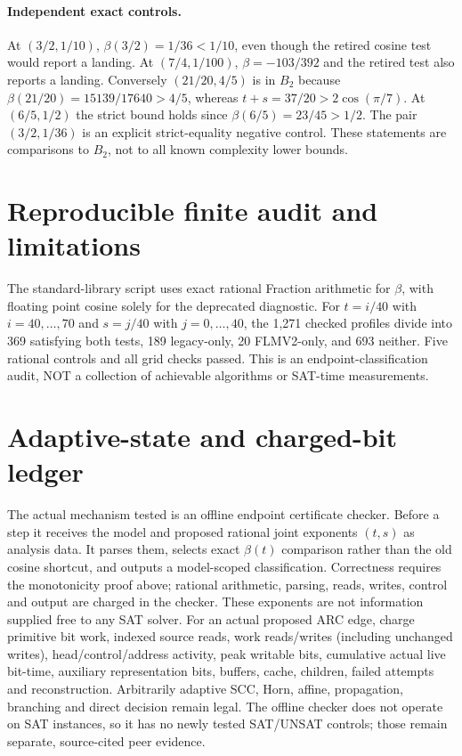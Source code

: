 \documentclass[11pt]{article}
\begin{document}
\paragraph{Independent exact controls.}
At $(3/2,1/10)$, $\beta(3/2)=1/36<1/10$, even though the retired cosine test would report a landing. At $(7/4,1/100)$, $\beta=-103/392$ and the retired test also reports a landing. Conversely $(21/20,4/5)$ is in $B_2$ because $\beta(21/20)=15139/17640>4/5$, whereas $t+s=37/20>2\cos(\pi/7)$. At $(6/5,1/2)$ the strict bound holds since $\beta(6/5)=23/45>1/2$. The pair $(3/2,1/36)$ is an explicit strict-equality negative control. These statements are comparisons to $B_2$, not to all known complexity lower bounds.

\section{Reproducible finite audit and limitations}
The standard-library script uses exact rational Fraction arithmetic for $\beta$, with floating point cosine solely for the deprecated diagnostic. For $t=i/40$ with $i=40,\ldots,70$ and $s=j/40$ with $j=0,\ldots,40$, the 1,271 checked profiles divide into 369 satisfying both tests, 189 legacy-only, 20 FLMV2-only, and 693 neither. Five rational controls and all grid checks passed. This is an endpoint-classification audit, NOT a collection of achievable algorithms or SAT-time measurements.

\section{Adaptive-state and charged-bit ledger}
The actual mechanism tested is an offline endpoint certificate checker. Before a step it receives the model and proposed rational joint exponents $(t,s)$ as analysis data. It parses them, selects exact $\beta(t)$ comparison rather than the old cosine shortcut, and outputs a model-scoped classification. Correctness requires the monotonicity proof above; rational arithmetic, parsing, reads, writes, control and output are charged in the checker. These exponents are not information supplied free to any SAT solver. For an actual proposed ARC edge, charge primitive bit work, indexed source reads, work reads/writes (including unchanged writes), head/control/address activity, peak writable bits, cumulative actual live bit-time, auxiliary representation bits, buffers, cache, children, failed attempts and reconstruction. Arbitrarily adaptive SCC, Horn, affine, propagation, branching and direct decision remain legal. The offline checker does not operate on SAT instances, so it has no newly tested SAT/UNSAT controls; those remain separate, source-cited peer evidence.
\end{document}
